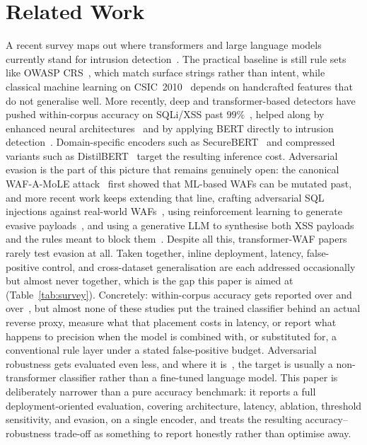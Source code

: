 \documentclass[conference]{IEEEtran}
\begin{document}
\section{Related Work}
A recent survey maps out where transformers and large language models
currently stand for intrusion detection~\cite{kheddar2025survey}. The
practical baseline is still rule sets like OWASP CRS~\cite{owaspcrs}, which
match surface strings rather than intent, while classical machine learning
on CSIC~2010~\cite{payloadml2024svmrfxgb} depends on handcrafted features
that do not generalise well. More recently, deep and transformer-based
detectors have pushed within-corpus accuracy on SQLi/XSS past
$99\%$~\cite{scireports2024novelxsssqli,liu2024bertlstm,wadbert2026}, helped
along by enhanced neural architectures~\cite{zhou2025ewebguard} and by
applying BERT directly to intrusion
detection~\cite{yang2025bertids,sdnbert2024}. Domain-specific encoders such
as SecureBERT~\cite{aghaei2022securebert,aghaei2025securebert2} and
compressed variants such as DistilBERT~\cite{sanh2019distilbert} target the
resulting inference cost. Adversarial evasion is the part of this picture
that remains genuinely open: the canonical WAF-A-MoLE
attack~\cite{demetrio2020wafamole} first showed that ML-based WAFs can be
mutated past, and more recent work keeps extending that line, crafting
adversarial SQL injections against real-world WAFs~\cite{advsqli2024}, using
reinforcement learning to generate evasive payloads~\cite{mlwaf2025peerj},
and using a generative LLM to synthesise both XSS payloads and the rules
meant to block them~\cite{genxss2025}. Despite all this, transformer-WAF
papers rarely test evasion at all. Taken together, inline deployment,
latency, false-positive control, and cross-dataset generalisation are each
addressed occasionally but almost never together, which is the gap this
paper is aimed at (Table~\ref{tab:survey}). Concretely: within-corpus
accuracy gets reported over and
over~\cite{scireports2024novelxsssqli,liu2024bertlstm,wadbert2026,zhou2025ewebguard},
but almost none of these studies put the trained classifier behind an
actual reverse proxy, measure what that placement costs in latency, or
report what happens to precision when the model is combined with, or
substituted for, a conventional rule layer under a stated false-positive
budget. Adversarial robustness gets evaluated even less, and where it
is~\cite{advsqli2024,mlwaf2025peerj}, the target is usually a
non-transformer classifier rather than a fine-tuned language model. This
paper is deliberately narrower than a pure accuracy benchmark: it reports
a full deployment-oriented evaluation, covering architecture, latency,
ablation, threshold sensitivity, and evasion, on a single encoder, and
treats the resulting accuracy--robustness trade-off as something to
report honestly rather than optimise away.
\end{document}
